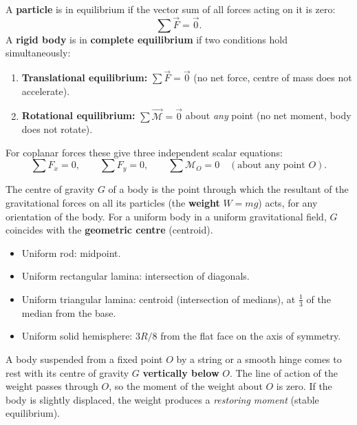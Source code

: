 \documentclass[11pt]{article}
\newcommand{\cle}[1]{{\popxbold\color{popdark}#1}}
\begin{document}
\begin{definition}
A \textbf{particle} is in equilibrium if the vector sum of all forces acting on it is zero:
\[ \sum \vec{F} = \vec{0}. \]
A \textbf{rigid body} is in \textbf{complete equilibrium} if two conditions hold simultaneously:
\begin{enumerate}
\item \textbf{Translational equilibrium:} $\sum \vec{F} = \vec{0}$ (no net force, centre of mass does not accelerate).
\item \textbf{Rotational equilibrium:} $\sum \vec{\mathcal{M}} = \vec{0}$ about \emph{any} point (no net moment, body does not rotate).
\end{enumerate}
For coplanar forces these give three independent scalar equations:
\[ \sum F_x = 0,\qquad \sum F_y = 0,\qquad \sum \mathcal{M}_O = 0 \quad (\text{about any point } O). \]
\end{definition}

\begin{propriete}
The \cle{centre of gravity} $G$ of a body is the point through which the resultant of the gravitational forces on all its particles (the \textbf{weight} $W=mg$) acts, for any orientation of the body. For a uniform body in a uniform gravitational field, $G$ coincides with the \textbf{geometric centre} (centroid).
\begin{itemize}
\item Uniform rod: midpoint.
\item Uniform rectangular lamina: intersection of diagonals.
\item Uniform triangular lamina: centroid (intersection of medians), at $\frac{1}{3}$ of the median from the base.
\item Uniform solid hemisphere: $3R/8$ from the flat face on the axis of symmetry.
\end{itemize}
\end{propriete}

\begin{propriete}
A body suspended from a fixed point $O$ by a string or a smooth hinge comes to rest with its centre of gravity $G$ \textbf{vertically below} $O$. The line of action of the weight passes through $O$, so the moment of the weight about $O$ is zero. If the body is slightly displaced, the weight produces a \emph{restoring moment} (stable equilibrium).
\end{propriete}
\end{document}
